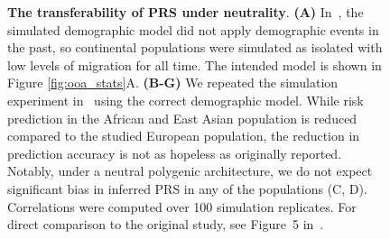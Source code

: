 \documentclass{article}
\begin{document}
\begin{figure}[ht]
\begin{center}
\caption{\textbf{The transferability of PRS under neutrality}.
    \textbf{(A)} In~\citet{martin2017human}, the simulated demographic model did not apply demographic
    events in the past, so continental populations were simulated as isolated with low levels of migration
    for all time. The intended model is shown in Figure \ref{fig:ooa_stats}A.
    \textbf{(B-G)} We repeated the simulation experiment in~\cite{martin2017human} using the correct
    demographic model.
    While risk prediction in the African and East Asian population is reduced compared to the studied
    European population, the reduction in prediction accuracy is not as hopeless as originally reported.
    Notably, under a neutral polygenic architecture, we do not expect significant bias in inferred PRS
    in any of the populations (C, D).
    Correlations were computed over 100 simulation replicates.
    For direct comparison to the original study, see Figure~5 in~\citet{martin2017human}.
}
\label{fig:prs}
\end{center}
\end{figure}
\end{document}
